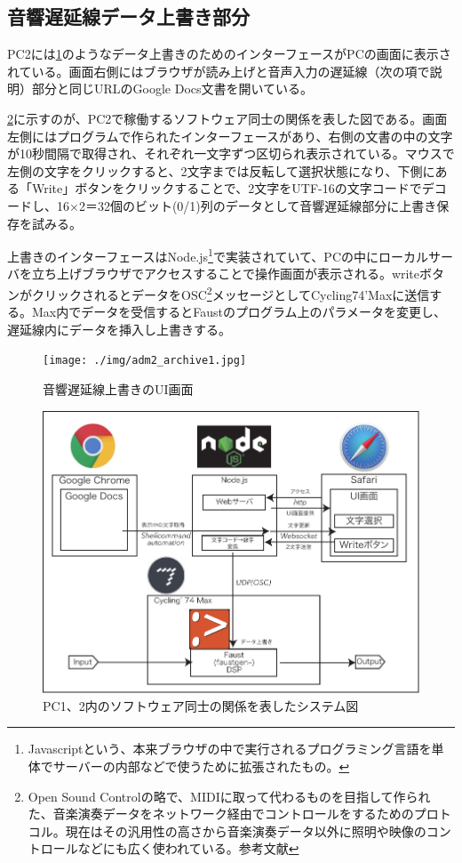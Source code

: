 \documentclass[a4paper,report]{jsbook}
\begin{document}
\subsection{音響遅延線データ上書き部分}\label{ux97f3ux97ffux9045ux5ef6ux7ddaux30c7ux30fcux30bfux4e0aux66f8ux304dux90e8ux5206}

PC2には\cref{fig:adm_writer}のようなデータ上書きのためのインターフェースがPCの画面に表示されている。画面右側にはブラウザが読み上げと音声入力の遅延線（次の項で説明）部分と同じURLのGoogle
Docs文書を開いている。

\cref{fig:writer_system}に示すのが、PC2で稼働するソフトウェア同士の関係を表した図である。画面左側にはプログラムで作られたインターフェースがあり、右側の文書の中の文字が10秒間隔で取得され、それぞれ一文字ずつ区切られ表示されている。マウスで左側の文字をクリックすると、2文字までは反転して選択状態になり、下側にある「Write」ボタンをクリックすることで、2文字をUTF-16の文字コードでデコードし、16×2＝32個のビット(0/1)列のデータとして音響遅延線部分に上書き保存を試みる。

上書きのインターフェースはNode.js\footnote{Javascriptという、本来ブラウザの中で実行されるプログラミング言語を単体でサーバーの内部などで使うために拡張されたもの。}で実装されていて、PCの中にローカルサーバを立ち上げブラウザでアクセスすることで操作画面が表示される。writeボタンがクリックされるとデータをOSC\footnote{Open
  Sound
  Controlの略で、MIDIに取って代わるものを目指して作られた、音楽演奏データをネットワーク経由でコントロールをするためのプロトコル。現在はその汎用性の高さから音楽演奏データ以外に照明や映像のコントロールなどにも広く使われている。参考文献\autocite{wright2003opensound}}メッセージとしてCycling74'Maxに送信する。Max内でデータを受信するとFaustのプログラム上のパラメータを変更し、遅延線内にデータを挿入し上書きする。

\begin{figure}[htbp]
\centering
\texttt{[image: ./img/adm2\_archive1.jpg]}
\caption{音響遅延線上書きのUI画面\label{fig:adm_writer}}
\end{figure}

\begin{figure}[htbp]
\centering
\includegraphics[width=1.00000\textwidth]{./img/admpart_diagram.pdf}
\caption{PC1、2内のソフトウェア同士の関係を表したシステム図\label{fig:writer_system}}
\end{figure}
\end{document}
